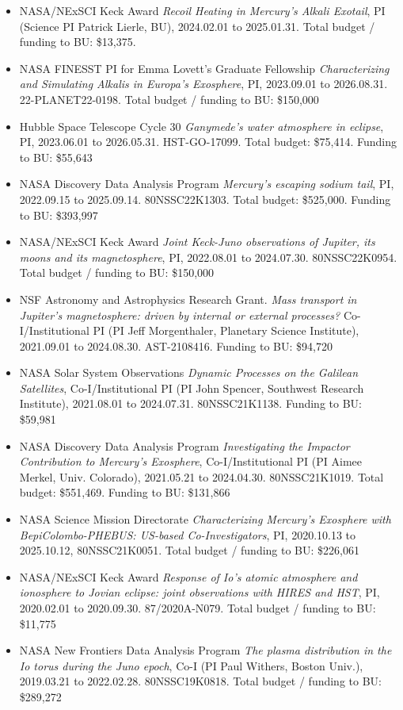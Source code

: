 \documentclass[12pt]{report}
\begin{document}
\begin{itemize}
 \item NASA/NExSCI Keck Award {\it Recoil Heating in Mercury's Alkali Exotail}, PI (Science PI Patrick Lierle, BU), 2024.02.01 to 2025.01.31. Total budget / funding to BU: \$13,375.
 \item NASA FINESST PI for Emma Lovett's Graduate Fellowship {\it Characterizing and Simulating Alkalis in Europa’s Exosphere}, PI, 2023.09.01 to 2026.08.31. 22-PLANET22-0198. Total budget / funding to BU: \$150,000
 \item Hubble Space Telescope Cycle 30 {\it Ganymede's water atmosphere in eclipse}, PI, 2023.06.01 to 2026.05.31. HST-GO-17099. Total budget: \$75,414. Funding to BU: \$55,643
 \item NASA Discovery Data Analysis Program {\it Mercury's escaping sodium tail}, PI, 2022.09.15 to 2025.09.14. 80NSSC22K1303. Total budget: \$525,000. Funding to BU: \$393,997
 \item NASA/NExSCI Keck Award {\it Joint Keck-Juno observations of Jupiter, its moons and its magnetosphere}, PI, 2022.08.01 to 2024.07.30. 80NSSC22K0954. Total budget / funding to BU: \$150,000
 \item NSF Astronomy and Astrophysics Research Grant. {\it Mass transport in Jupiter's magnetosphere: driven by internal or external processes?} Co-I/Institutional PI (PI Jeff Morgenthaler, Planetary Science Institute), 2021.09.01 to 2024.08.30. AST-2108416. Funding to BU: \$94,720
 \item NASA Solar System Observations {\it Dynamic Processes on the Galilean Satellites}, Co-I/Institutional PI (PI John Spencer, Southwest Research Institute), 2021.08.01 to 2024.07.31. 80NSSC21K1138. Funding to BU: \$59,981
 \item NASA Discovery Data Analysis Program {\it Investigating the Impactor Contribution to Mercury's Exosphere}, Co-I/Institutional PI (PI Aimee Merkel, Univ. Colorado), 2021.05.21 to 2024.04.30. 80NSSC21K1019. Total budget: \$551,469. Funding to BU: \$131,866
 \item NASA Science Mission Directorate {\it Characterizing Mercury’s Exosphere with BepiColombo-PHEBUS: US-based Co-Investigators}, PI, 2020.10.13 to 2025.10.12, 80NSSC21K0051. Total budget / funding to BU: \$226,061
 \item NASA/NExSCI Keck Award {\it Response of Io's atomic atmosphere and ionosphere to Jovian eclipse: joint observations with HIRES and HST}, PI, 2020.02.01 to 2020.09.30. 87/2020A-N079. Total budget / funding to BU: \$11,775
 \item NASA New Frontiers Data Analysis Program {\it The plasma distribution in the Io torus during the Juno epoch}, Co-I (PI Paul Withers, Boston Univ.), 2019.03.21 to 2022.02.28. 80NSSC19K0818. Total budget / funding to BU: \$289,272

\end{itemize}
\end{document}

